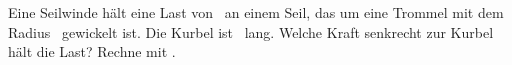 Eine Seilwinde hält eine Last von \MLO\ an einem Seil, das um eine Trommel mit dem Radius \rTO\ gewickelt ist. Die Kurbel ist \RKO\ lang. Welche Kraft senkrecht zur Kurbel hält die Last? Rechne mit \gO.
